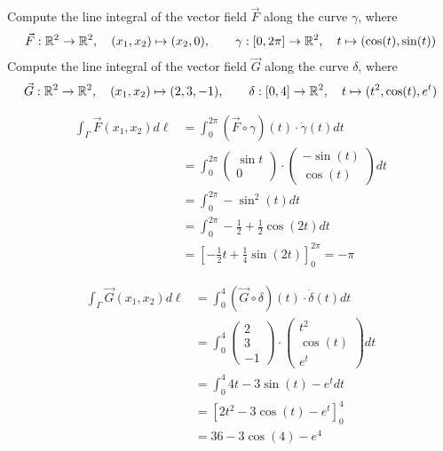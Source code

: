 \documentclass[11pt]{article}
\begin{document}

\begin{exercise}
    Compute the line integral of the vector field $\vec{F}$ along the curve $\gamma$, where 
    \[
        \vec F : \mathbb{R}^2 \to \mathbb{R}^2, \quad (x_1,x_2) \mapsto ( x_2, 0 ), \qquad \gamma : [0,2\pi]  \to \mathbb{R}^2, \quad t \mapsto ( \cos(t), \sin(t) )
    \]
    Compute the line integral of the vector field $\vec{G}$ along the curve $\delta$, where 
    \[
        \vec G : \mathbb{R}^2 \to \mathbb{R}^2, \quad (x_1,x_2) \mapsto ( 2, 3, -1 ), \qquad \delta : [0,4]  \to \mathbb{R}^2, \quad t \mapsto  ( t^2, \cos(t), e^t )
    \]
\end{exercise}
\begin{solution}
\begin{align*}
\int_{\Gamma} \vec{F}(x_1,x_2) d\ell &= \int_{0}^{2\pi} (\vec{F}\circ \gamma)(t)\cdot \dot{\gamma}(t)dt\\
&= \int_{0}^{2\pi} \begin{pmatrix}\sin t\\ 0\end{pmatrix}\cdot \begin{pmatrix} -\sin(t)\\ \cos(t)\end{pmatrix}dt\\
&= \int_{0}^{2\pi}  -\sin^2(t)dt\\
&= \int_{0}^{2\pi}  -\frac{1}{2}+\frac{1}{2}\cos(2t)dt\\
&= \left[-\frac{1}{2}t + \frac{1}{4}\sin(2t)\right]_{0}^{2\pi} = -\pi
\end{align*}

\begin{align*}
\int_{\Gamma} \vec{G}(x_1,x_2) d\ell &= \int_{0}^{4} (\vec{G}\circ \delta)(t)\cdot \dot{\delta}(t)dt\\
&= \int_{0}^{4}\begin{pmatrix} 2\\ 3\\ -1\end{pmatrix} \cdot  \begin{pmatrix}t^2\\ \cos(t) \\ e^t \end{pmatrix}dt\\
&= \int_{0}^{4} 4t - 3\sin(t) - e^t dt\\
&= \left[2t^2 - 3\cos(t) - e^{t} \right]_{0}^{4}\\
&= 36 -3\cos(4)-e^4
\end{align*}
\end{solution}
\end{document}
